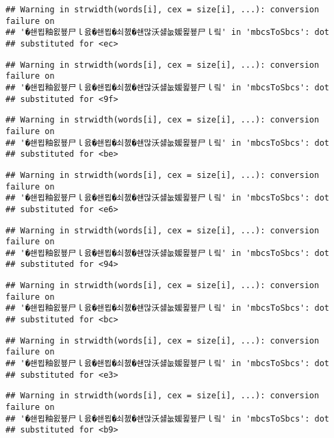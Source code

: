 \documentclass[]{article}
\begin{document}
\begin{verbatim}
## Warning in strwidth(words[i], cex = size[i], ...): conversion failure on
## '�쇈묍釉욄뵾尸ｌ읈�쇈묍�쇠쳸�쇈많沃섏눖媛묉뵾尸ｌ맄' in 'mbcsToSbcs': dot
## substituted for <ec>
\end{verbatim}

\begin{verbatim}
## Warning in strwidth(words[i], cex = size[i], ...): conversion failure on
## '�쇈묍釉욄뵾尸ｌ읈�쇈묍�쇠쳸�쇈많沃섏눖媛묉뵾尸ｌ맄' in 'mbcsToSbcs': dot
## substituted for <9f>
\end{verbatim}

\begin{verbatim}
## Warning in strwidth(words[i], cex = size[i], ...): conversion failure on
## '�쇈묍釉욄뵾尸ｌ읈�쇈묍�쇠쳸�쇈많沃섏눖媛묉뵾尸ｌ맄' in 'mbcsToSbcs': dot
## substituted for <be>
\end{verbatim}

\begin{verbatim}
## Warning in strwidth(words[i], cex = size[i], ...): conversion failure on
## '�쇈묍釉욄뵾尸ｌ읈�쇈묍�쇠쳸�쇈많沃섏눖媛묉뵾尸ｌ맄' in 'mbcsToSbcs': dot
## substituted for <e6>
\end{verbatim}

\begin{verbatim}
## Warning in strwidth(words[i], cex = size[i], ...): conversion failure on
## '�쇈묍釉욄뵾尸ｌ읈�쇈묍�쇠쳸�쇈많沃섏눖媛묉뵾尸ｌ맄' in 'mbcsToSbcs': dot
## substituted for <94>
\end{verbatim}

\begin{verbatim}
## Warning in strwidth(words[i], cex = size[i], ...): conversion failure on
## '�쇈묍釉욄뵾尸ｌ읈�쇈묍�쇠쳸�쇈많沃섏눖媛묉뵾尸ｌ맄' in 'mbcsToSbcs': dot
## substituted for <bc>
\end{verbatim}

\begin{verbatim}
## Warning in strwidth(words[i], cex = size[i], ...): conversion failure on
## '�쇈묍釉욄뵾尸ｌ읈�쇈묍�쇠쳸�쇈많沃섏눖媛묉뵾尸ｌ맄' in 'mbcsToSbcs': dot
## substituted for <e3>
\end{verbatim}

\begin{verbatim}
## Warning in strwidth(words[i], cex = size[i], ...): conversion failure on
## '�쇈묍釉욄뵾尸ｌ읈�쇈묍�쇠쳸�쇈많沃섏눖媛묉뵾尸ｌ맄' in 'mbcsToSbcs': dot
## substituted for <b9>
\end{verbatim}
\end{document}
